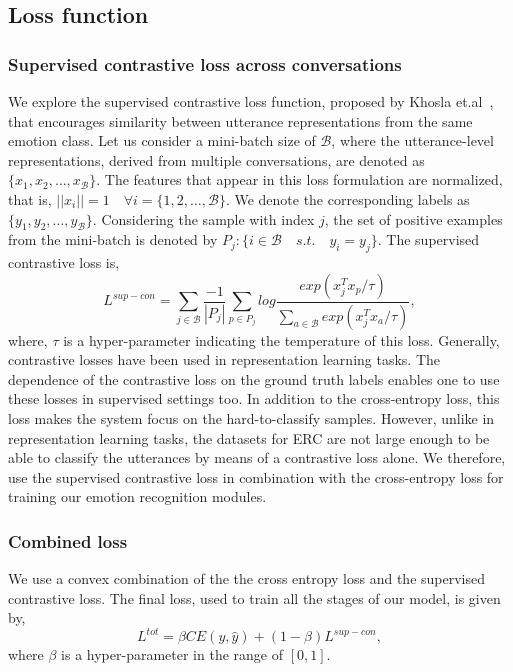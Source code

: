 \documentclass[lettersize,journal]{IEEEtran}
\begin{document}
\subsection{Loss function}\label{loss}
\subsubsection{Supervised contrastive loss across conversations}\label{supconlossdescr}
We explore the supervised contrastive loss function, proposed by Khosla et.al~\cite{khosla2020supervised}, that encourages similarity between utterance representations from the same emotion class. Let us consider a mini-batch size of $\mathcal{B}$, where the utterance-level representations, derived from multiple conversations,  are denoted as $\{x_1, x_2, \dots, x_\mathcal{B}\}$. The features that appear in this loss formulation are normalized, that is, $||x_i|| = 1 \quad \forall i = \{1,2,\dots,\mathcal{B}\}$. We denote the corresponding labels as $\{y_1, y_2, \dots, y_\mathcal{B}\}$. Considering the sample with index $j$, the set of positive examples from the mini-batch is denoted by $P_j: \{i \in \mathcal{B} \quad s.t. \quad y_i = y_j\}$. The supervised contrastive loss is,
\begin{equation}\label{supconeq}
    L^{sup-con} = \sum_{j\in \mathcal{B}} \frac{-1}{|P_j|}\sum_{p \in P_j} log \frac{exp(x_j^T x_p/\tau)}{\sum \limits_{a\in \mathcal{B}}exp(x_j^T x_a/\tau)},
\end{equation}
where, $\tau$ is a hyper-parameter indicating the temperature of this loss.
Generally, contrastive losses have been used in representation learning tasks. The dependence of the contrastive loss on the ground truth labels enables one to use these losses in supervised settings too. In addition to the cross-entropy loss, this loss makes the system focus on the hard-to-classify samples. However, unlike in representation learning tasks, the datasets for ERC are not large enough to be able to classify the utterances by means of a contrastive loss alone. We therefore, use the supervised contrastive loss in combination with the cross-entropy loss for training our emotion recognition modules.


\subsubsection{Combined loss}
We use a convex combination of the the cross entropy loss and the supervised contrastive loss. The final loss, used to train all the stages of our model, is given by,
\begin{equation}\label{lossfinal}
    L^{tot} = \beta CE(y, \hat{y}) + (1-\beta)L^{sup-con},
\end{equation}
where $\beta$ is a hyper-parameter in the range of $[0,1]$.
\end{document}
